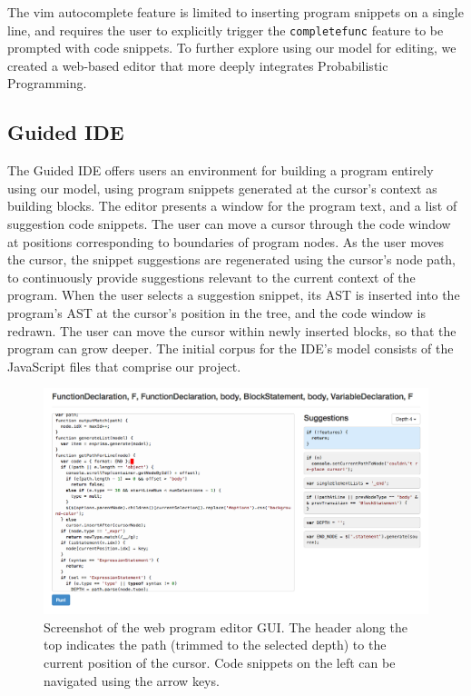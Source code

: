 \documentclass{article}
\begin{document}
The vim autocomplete feature is limited to inserting program snippets on a single
line, and requires the user to explicitly trigger the \texttt{completefunc}
feature to be prompted with code snippets. To further explore using our model
for editing, we created a web-based editor that more deeply integrates Probabilistic
Programming.

\subsection{Guided IDE}

The Guided IDE offers users an environment for building a program entirely using
our model, using program snippets generated at the cursor's context as building
blocks. The editor presents a window for the program text, and a list of
suggestion code snippets. The user can move a cursor through the code window at
positions corresponding to boundaries of program nodes. As the user moves the
cursor, the snippet suggestions are regenerated using the cursor's node path, to
continuously provide suggestions relevant to the current context of the program. When the
user selects a suggestion snippet, its AST is inserted into the program's AST at
the cursor's position in the tree, and the code window is redrawn. The user can
move the cursor within newly inserted blocks, so that the program can grow
deeper. The initial corpus for the IDE's model consists of the JavaScript files
that comprise our project.

\begin{figure}[h]
  \centering
  \includegraphics[width=1.00\textwidth]{ide}
  \caption{Screenshot of the web program editor GUI. The header along the top indicates the path (trimmed to the selected depth) to the current position of the cursor. Code snippets on the left can be navigated using the arrow keys.} \label{fig:screenshot}
\end{figure}
\end{document}
